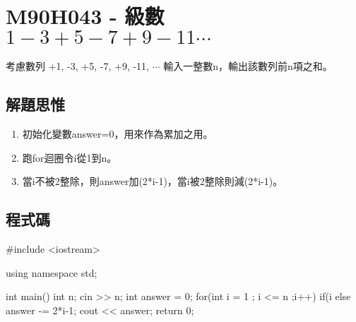 \section{M90H043 - 級數 $1-3+5-7+9-11\cdots$}
考慮數列 +1, -3, +5, -7, +9, -11, $\cdots$
輸入一整數n，輸出該數列前n項之和。
\subsection{解題思惟}
\begin{enumerate}
	\item 初始化變數answer=0，用來作為累加之用。
	\item 跑for迴圈令i從1到n。
	\item 當i不被2整除，則answer加(2*i-1)，當i被2整除則減(2*i-1)。
\end{enumerate}
\subsection{程式碼}
\begin{cppcode}
#include <iostream>

using namespace std;

int main()
{
	int n;
	cin >> n;
	int answer = 0;
	for(int i = 1 ; i <= n ;i++)
	{
		if(i%
		else answer -= 2*i-1;
	}
	cout << answer;
	return 0;
}
\end{cppcode}
